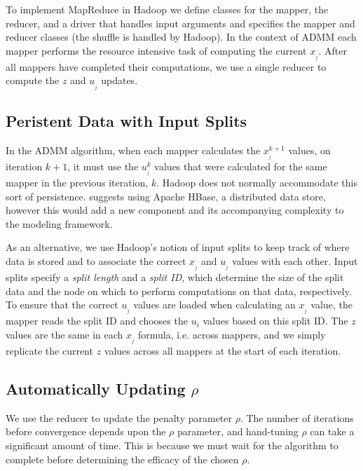 \documentclass[10pt, conference, compsocconf]{IEEEtran}
\begin{document}
To implement MapReduce in Hadoop we define classes for the mapper, the reducer, and a driver that handles input arguments and specifies the mapper and reducer classes (the shuffle is handled by Hadoop).  In the context of ADMM each mapper performs the resource intensive task of computing the current $x_{_j}$.  After all mappers have completed their computations, we use a single reducer to compute the $z$ and $u_{_j}$ updates.

\subsection{Peristent Data with Input Splits}
In the ADMM algorithm, when each mapper calculates the $x_{_j}^{k+1}$ values, on iteration $k+1$, it must use the $u_{_j}^k$ values that were calculated for the same mapper in the previous iteration, $k$.  Hadoop does not normally accommodate this sort of persistence.  \cite{boyd} suggests using Apache HBase, a distributed data store, however this would add a new component and its accompanying complexity to the modeling framework.

As an alternative, we use Hadoop's notion of input splits to keep track of where data is stored and to associate the correct $x_{_j}$ and $u_{_j}$ values with each other.  Input splits specify a \emph{split length} and a \emph{split ID}, which determine the size of the split data and the node on which to perform computations on that data, respectively.  To ensure that the correct $u_{_j}$ values are loaded when calculating an $x_{_j}$ value, the mapper reads the split ID and chooses the $u_i$ values based on this split ID.  The $z$ values are the same in each $x_{_j}$ formula, i.e. across mappers, and we simply replicate the current $z$ values across all mappers at the start of each iteration.

\subsection{Automatically Updating $\rho$}

We use the reducer to update the penalty parameter $\rho$.  The number of iterations before convergence depends upon the $\rho$ parameter, and hand-tuning $\rho$ can take a significant amount of time.  This is because we must wait for the algorithm to complete before determining the efficacy of the chosen $\rho$.
\end{document}
